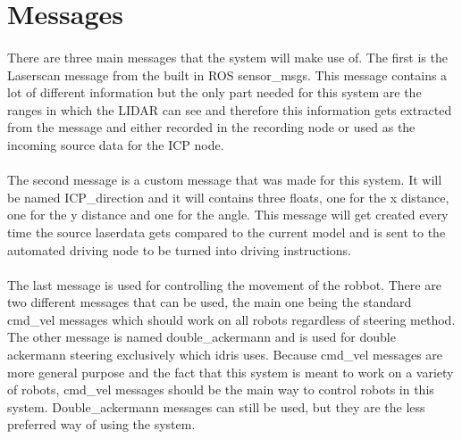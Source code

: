 
\section{Messages}
\paragraph{}
There are three main messages that the system will make use of. The first is the Laserscan message from the built in ROS sensor\_msgs. This message contains a lot of different information but the only part needed for this system are the ranges in which the LIDAR can see and therefore this information gets extracted from the message and either recorded in the recording node or used as the incoming source data for the ICP node.
\paragraph{}
The second message is a custom message that was made for this system. It will be named ICP\_direction and it will contains three floats, one for the x distance, one for the y distance and one for the angle. This message will get created every time the source laserdata gets compared to the current model and is sent to the automated driving node to be turned into driving instructions.
\paragraph{}
The last message is used for controlling the movement of the robbot. There are two different messages that can be used, the main one being the standard cmd\_vel messages which should work on all robots regardless of steering method. The other message is named double\_ackermann and is used for double ackermann steering exclusively which idris uses. Because cmd\_vel messages are more general purpose and the fact that this system is meant to work on a variety of robots, cmd\_vel messages should be the main way to control robots in this system. Double\_ackermann messages can still be used, but they are the less preferred way of using the system.
